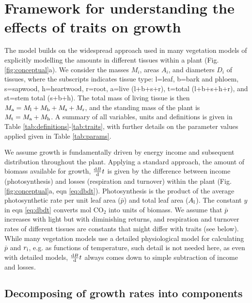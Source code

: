 \documentclass[a4paper,11pt]{article}
\begin{document}
\section{Framework for understanding the effects of traits on growth}

The {\plant} model builds on the widespread approach used in many vegetation models of explicitly modelling the amounts in different tissues within a plant \citep[e.g.][]{Givnish-1988, Makela-1997, Moorcroft-2001, Sitch-2008, Falster-2011, King-2011, DeKauwe-2014} (Fig. \ref{fig:conceptual}a). We consider the masses $M_i$, areas $A_i$, and diameters $D_i$ of tissues, where the subscripts indicates tissue type: l=leaf, b=bark and phloem, s=sapwood, h=heartwood, r=root, a=live (l+b+s+r), t=total (l+b+s+h+r), and st=stem total (s+b+h). The total mass of living tissue is then $M_{\rm a}=M_{\rm l}+M_{\rm b}+M_{\rm s}+M_{\rm r}$, and the standing mass of the plant is $M_{\rm t}=M_{\rm a}+M_{\rm h}$. A summary of all variables, units and definitions is given in Table \ref{tab:definitions}-\ref{tab:traits}, with further details on the parameter values applied given in Table \ref{tab:params}.

We assume growth is fundamentally driven by energy income and subsequent distribution throughout the plant. Applying a standard approach, the amount of biomass available for growth, $\frac{{\rm d}B}{{\rm d}}t$ is given by the difference between income (photosynthesis) and losses (respiration and turnover) within the plant \citep{Makela-1997, Thornley-2000} (Fig. \ref{fig:conceptual}a, eqn \ref{eq:dbdt}). Photosynthesis is the product of the average photosynthetic rate per unit leaf area ($\bar{p}$) and total leaf area ($A_{\rm l}$). The constant $y$ in eqn \ref{eq:dbdt} converts mol CO$_2$ into units of biomass. We assume that $\bar{p}$ increases with light but with diminishing returns, and respiration and turnover rates of different tissues are constants that might differ with traits (see below). While many vegetation models use a detailed physiological model for calculating $\bar{p}$ and $r_{\rm i}$, e.g. as functions of temperature, such detail is not needed here, as even with detailed models, $\frac{{\rm d}B}{{\rm d}}t$ always comes down to simple subtraction of income and losses.

\subsection{Decomposing of growth rates into components}
\end{document}
